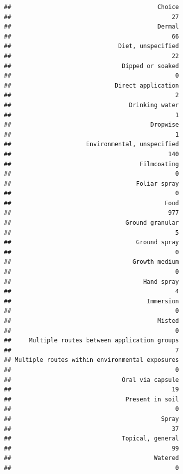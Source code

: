 \documentclass[
  12pt,
]{article}
\begin{document}
\begin{verbatim}
##                                         Choice 
##                                             27 
##                                         Dermal 
##                                             66 
##                              Diet, unspecified 
##                                             22 
##                               Dipped or soaked 
##                                              0 
##                             Direct application 
##                                              2 
##                                 Drinking water 
##                                              1 
##                                       Dropwise 
##                                              1 
##                     Environmental, unspecified 
##                                            140 
##                                    Filmcoating 
##                                              0 
##                                   Foliar spray 
##                                              0 
##                                           Food 
##                                            977 
##                                Ground granular 
##                                              5 
##                                   Ground spray 
##                                              0 
##                                  Growth medium 
##                                              0 
##                                     Hand spray 
##                                              4 
##                                      Immersion 
##                                              0 
##                                         Misted 
##                                              0 
##     Multiple routes between application groups 
##                                              7 
## Multiple routes within environmental exposures 
##                                              0 
##                               Oral via capsule 
##                                             19 
##                                Present in soil 
##                                              0 
##                                          Spray 
##                                             37 
##                               Topical, general 
##                                             99 
##                                        Watered 
##                                              0
\end{verbatim}
\end{document}
